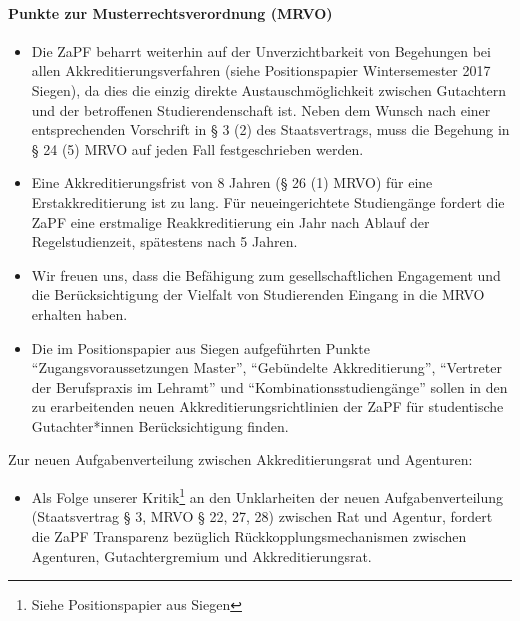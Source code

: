 \paragraph{Punkte zur Musterrechtsverordnung (MRVO)}
\begin{itemize}
  \item Die ZaPF beharrt weiterhin auf der Unverzichtbarkeit von Begehungen bei allen Akkreditierungsverfahren (siehe Positionspapier Wintersemester 2017 Siegen), da dies die einzig direkte Austauschmöglichkeit zwischen Gutachtern und der betroffenen Studierendenschaft ist.
      Neben dem Wunsch nach einer entsprechenden Vorschrift in § 3 (2) des Staatsvertrags, muss die Begehung in § 24 (5) MRVO auf jeden Fall festgeschrieben werden.

  \item Eine Akkreditierungsfrist von 8 Jahren (§ 26 (1) MRVO) für eine Erstakkreditierung ist zu lang. Für neueingerichtete Studiengänge fordert die ZaPF eine erstmalige Reakkreditierung ein Jahr nach Ablauf der Regelstudienzeit, spätestens nach 5 Jahren.

  \item Wir freuen uns, dass die Befähigung zum gesellschaftlichen Engagement und die Berücksichtigung der Vielfalt von Studierenden Eingang in die MRVO erhalten haben.

  \item Die im Positionspapier aus Siegen aufgeführten Punkte "`Zugangsvoraussetzungen Master"', "`Gebündelte Akkreditierung"', "`Vertreter der Berufspraxis im Lehramt"' und "`Kombinationsstudiengänge"' sollen in den zu erarbeitenden neuen Akkreditierungsrichtlinien der ZaPF für studentische Gutachter*innen Berücksichtigung finden.
\end{itemize}
Zur neuen Aufgabenverteilung zwischen Akkreditierungsrat und Agenturen:
\begin{itemize}
  \item Als Folge unserer Kritik\footnote{Siehe Positionspapier aus Siegen} an den Unklarheiten der neuen Aufgabenverteilung (Staatsvertrag § 3, MRVO § 22, 27, 28) zwischen Rat und Agentur, fordert die ZaPF Transparenz bezüglich Rückkopplungsmechanismen zwischen Agenturen, Gutachtergremium und Akkreditierungsrat.
\end{itemize}
